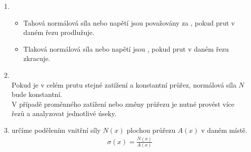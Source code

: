 \documentclass[letterpaper,10pt,english]{jupyterBook}
\begin{document}
{{\begin{itemize}
\end{itemize}

\noindent{}
\begin{enumerate}
%
\setcounter{enumi}{4}
\item {} 
\sphinxAtStartPar
{}
\begin{itemize}
\item {} 
\sphinxAtStartPar
Tahová normálová síla  nebo napětí jsou považovány za , pokud prut v daném řezu prodlužuje.

\item {} 
\sphinxAtStartPar
Tlaková normálová síla nebo napětí jsou , pokud prut v daném řezu zkracuje.

\end{itemize}

\item {} 
\sphinxAtStartPar
{}\\
Pokud je v celém prutu stejné zatížení a konstantní průřez, normálová síla \(N\) bude konstantní.\\
V případě proměnného zatížení nebo změny průřezu je nutné provést více řezů a analyzovat jednotlivé úseky.

\item {} 
\sphinxAtStartPar
{} určíme podělením vnitřní síly \(N(x)\) plochou průřezu \(A(x)\) v daném místě.
\begin{equation*}
\begin{split}\sigma(x) = \frac{N(x)}{A(x)} \end{split}
\end{equation*}
\end{enumerate}


}}
\end{document}
